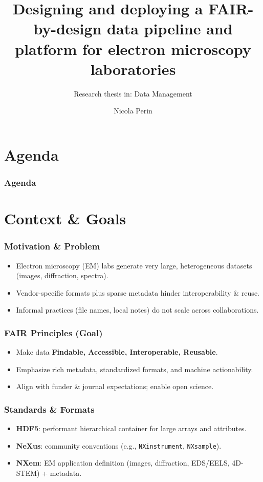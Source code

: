 \documentclass{beamer}
\title[FAIR-by-design EM pipeline]{Designing and deploying a FAIR-by-design data pipeline and platform for electron microscopy laboratories}
\subtitle{Research thesis in: Data Management}
\institute{University of Trieste}
\author[Nicola Perin]{Nicola Perin}
\begin{document}
\begin{frame}
\setTitlestyleDissertation
\maketitle
\end{frame}

\section*{Agenda}
\begin{frame}
    \frametitle{Agenda}
    \tableofcontents
\end{frame}

\section{Context \& Goals}

\begin{frame}
    \frametitle{Motivation \& Problem}
    \begin{itemize}
        \item Electron microscopy (EM) labs generate very large, heterogeneous datasets (images, diffraction, spectra).
        \item Vendor-specific formats plus sparse metadata hinder interoperability \& reuse.
        \item Informal practices (file names, local notes) do not scale across collaborations.
    \end{itemize}
\end{frame}

\begin{frame}
    \frametitle{FAIR Principles (Goal)}
    \begin{itemize}
        \item Make data \textbf{Findable, Accessible, Interoperable, Reusable}.
        \item Emphasize rich metadata, standardized formats, and machine actionability.
        \item Align with funder \& journal expectations; enable open science.
    \end{itemize}
\end{frame}

\begin{frame}
    \frametitle{Standards \& Formats}
    \begin{itemize}
        \item \textbf{HDF5}: performant hierarchical container for large arrays and attributes.
        \item \textbf{NeXus}: community conventions (e.g., \texttt{NXinstrument}, \texttt{NXsample}).
        \item \textbf{NXem}: EM application definition (images, diffraction, EDS/EELS, 4D-STEM) + metadata.
    \end{itemize}
\end{frame}
\end{document}
